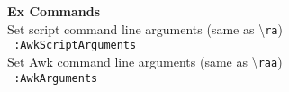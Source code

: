 \documentclass[oneside,10pt,landscape,DIV17]{scrartcl}
\begin{document}
\begin{multicols}{3}
\begin{center}
%
\begin{flushleft}
\large{\textbf{Ex Commands}}\\[1.0ex]
%
Set script command line arguments (same as \textbackslash\texttt{ra})\\[1.0ex]
\texttt{ :AwkScriptArguments}\\[1.0ex]
%
Set Awk command line arguments (same as \textbackslash\texttt{raa})\\[1.0ex]
\texttt{ :AwkArguments}\\[1.0ex]
\end{flushleft}
%
\end{center}%
\end{multicols}%
%
\end{document}
